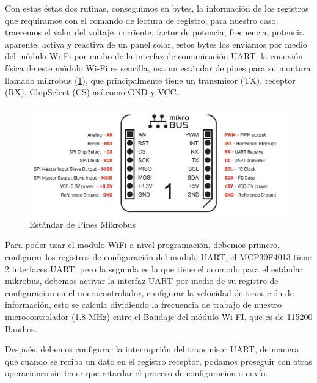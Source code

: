 Con estas éstas dos rutinas, conseguimos en bytes, la información de los registros que requiramos con el comando de lectura de registro, para nuestro caso, traeremos el valor del voltaje, corriente, factor de potencia, frecuencia, potencia aparente, activa y reactiva de un panel solar, estos bytes los enviamos por medio del módulo Wi-Fi por medio de la interfaz de comunicación UART, la conexión física de este módulo Wi-Fi es sencilla, usa un estándar de pines para su montura llamado mikrobus (\ref{fig:Mikrobus}), que principalmente tiene un transmisor (TX), receptor (RX), ChipSelect (CS) así como GND y VCC. 

\begin{figure}[H]
	\centering
	\includegraphics[scale=.2]{Capitulo2/images/mikrobus.png}
	\caption{Estándar de Pines Mikrobus}
	\label{fig:Mikrobus}
\end{figure}

Para poder usar el modulo WiFi a nivel programación, debemos primero, configurar los registros de configuración del modulo UART, el MCP30F4013 tiene 2 interfaces UART, pero la segunda es la que tiene el acomodo para el estándar mikrobus, debemos activar la interfaz UART por medio de su registro de configuracion en el microcontrolador, configurar la velocidad de transición de información, esto se calcula dividiendo la frecuencia de trabajo de nuestro microcontrolador (1.8 MHz) entre el Baudaje del módulo Wi-FI, que es de 115200 Baudios.

Después, debemos configurar la interrupción del transmisor UART, de manera que cuando se reciba un dato en el registro receptor, podamos proseguir con otras operaciones sin tener que retardar el proceso de configuracion o envío.


